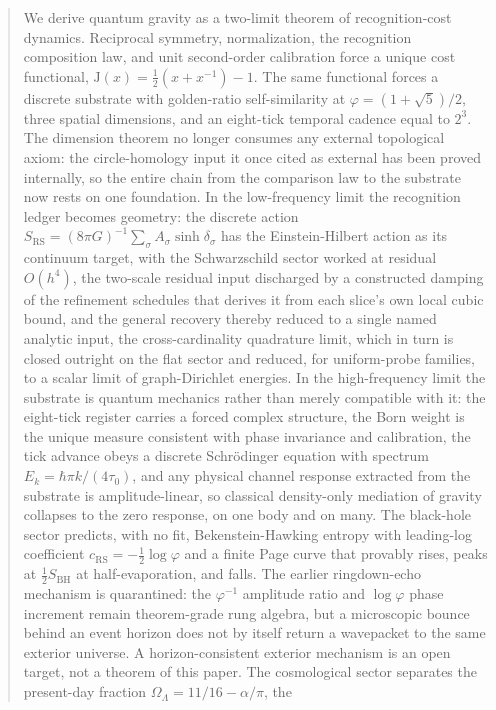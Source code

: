 \documentclass[11pt,letterpaper]{article}
\theoremstyle{definition}
\newcommand{\J}{\mathrm{J}}
\newcommand{\phiG}{\varphi}
\newcommand{\RS}{\mathrm{RS}}
\newcommand{\BH}{\mathrm{BH}}
\newcommand{\half}{\tfrac{1}{2}}
\begin{document}
\begin{abstract}
We derive quantum gravity as a two-limit theorem of recognition-cost
dynamics.  Reciprocal symmetry, normalization, the recognition
composition law, and unit second-order calibration force a unique cost
functional, $\J(x)=\half(x+x^{-1})-1$.  The same functional forces a
discrete substrate with golden-ratio self-similarity at
$\phiG=(1+\sqrt5)/2$, three spatial dimensions, and an eight-tick
temporal cadence equal to $2^3$.  The dimension theorem no longer
consumes any external topological axiom: the circle-homology input it
once cited as external has been proved internally, so the entire chain
from the comparison law to the substrate now rests on one foundation.
In the low-frequency limit the recognition ledger becomes geometry: the
discrete action $S_\RS=(8\pi G)^{-1}\sum_\sigma A_\sigma
\sinh\delta_\sigma$ has the Einstein-Hilbert action as its continuum
target, with the Schwarzschild sector worked at residual $O(h^4)$, the
two-scale residual input discharged by a constructed damping of the
refinement schedules that derives it from each slice's own local cubic
bound, and the general recovery thereby reduced to a single named
analytic input, the cross-cardinality quadrature limit, which in turn
is closed outright on the flat sector and reduced, for uniform-probe
families, to a scalar limit of graph-Dirichlet energies.  In the high-frequency limit the substrate is
quantum mechanics rather than merely compatible with it: the
eight-tick register carries a forced complex structure, the Born weight
is the unique measure consistent with phase invariance and calibration,
the tick advance obeys a discrete Schr\"odinger equation with spectrum
$E_k=\hbar\pi k/(4\tau_0)$, and any physical channel response extracted
from the substrate is amplitude-linear, so classical density-only
mediation of gravity collapses to the zero response, on one body and on
many.  The black-hole sector predicts, with no fit, Bekenstein-Hawking
entropy with leading-log coefficient $c_\RS=-\half\log\phiG$ and a
finite Page curve that provably rises, peaks at $\half S_\BH$ at
half-evaporation, and falls.  The earlier ringdown-echo mechanism is
quarantined: the $\phiG^{-1}$ amplitude ratio and $\log\phiG$ phase
increment remain theorem-grade rung algebra, but a microscopic bounce
behind an event horizon does not by itself return a wavepacket to the
same exterior universe.  A horizon-consistent exterior mechanism is an
open target, not a theorem of this paper.  The cosmological sector separates
the present-day fraction $\Omega_\Lambda=11/16-\alpha/\pi$, the

\end{abstract}
\end{document}
